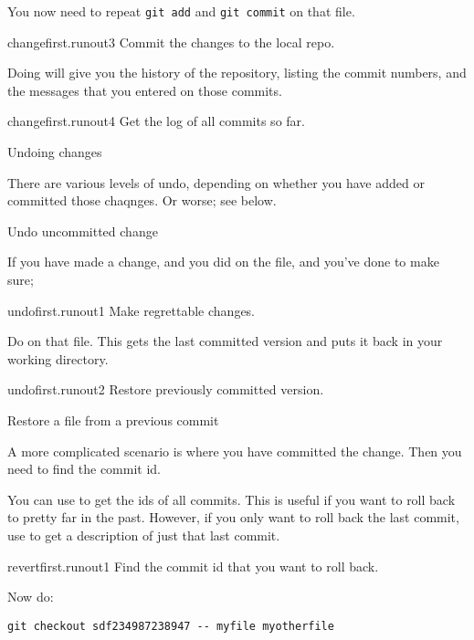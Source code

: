 You now need to repeat \lstinline{git add} and \lstinline{git commit} on that file.

\begin{gitstep}{changefirst.runout3}
  Commit the changes to the local repo.
\end{gitstep}

Doing  will give you the history of the repository,
listing the commit numbers, and the messages that you entered on those commits.

\begin{gitstep}{changefirst.runout4}
  Get the log of all commits so far.
\end{gitstep}

 {Undoing changes}

There are various levels of undo, depending on whether you have added or committed
those chaqnges. Or worse; see below.

 {Undo uncommitted change}

If you have made a change, and you did  on the file,
and you've done  to make sure;

\begin{gitstep}{undofirst.runout1}
  Make regrettable changes.
\end{gitstep}

Do  on that file. This gets the last committed version
and puts it back in your working directory.

\begin{gitstep}{undofirst.runout2}
  Restore previously committed version.
\end{gitstep}

 {Restore a file from a previous commit}

A more complicated scenario is where you have committed the change.
Then you need to find the commit id.

You can use  to get the ids of all commits.
This is useful if you want to roll back to pretty far in the past.
However, if you only want to roll back the last commit,
use  to get a description of just that last commit.

\begin{gitstep}{revertfirst.runout1}
  Find the commit id that you want to roll back.
\end{gitstep}

Now do:
\begin{lstlisting}
git checkout sdf234987238947 -- myfile myotherfile
\end{lstlisting}

